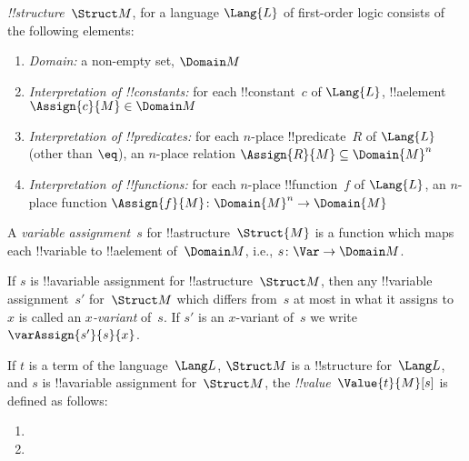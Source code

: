 \documentclass[../../../../include/open-logic-section]{subfiles}
\begin{document}


\begin{defn}[!!^{structure}s]
     \emph{!!{structure}}~$\Struct M$, for a language
    $\Lang{L}$ of first-order logic consists of the following elements:
    \begin{enumerate}
    \item \emph{Domain:} a non-empty set, $\Domain M$
    \item \emph{Interpretation of !!{constant}s:} for each !!{constant}~$c$ of
      $\Lang{L}$, !!a{element} $\Assign{c}{M} \in \Domain M$
    \item \emph{Interpretation of !!{predicate}s:} for each $n$-place
      !!{predicate}~$R$ of $\Lang{L}$ (other than $\eq$), an $n$-place
      relation $\Assign{R}{M} \subseteq \Domain{M}^n$
    \item \emph{Interpretation of !!{function}s:} for each $n$-place
      !!{function}~$f$ of $\Lang{L}$, an $n$-place function $\Assign{f}{M}
      \colon \Domain{M}^n \to \Domain{M}$
    \end{enumerate}
\end{defn}
    
\begin{defn}
    A \emph{variable assignment}~$s$ for !!a{structure}~$\Struct{M}$ is a
    function which maps each !!{variable} to !!a{element} of~$\Domain M$,
    i.e., $s\colon \Var \to \Domain M$.
\end{defn}


\begin{defn}[$x$-Variant]
    If $s$ is !!a{variable} assignment for !!a{structure}~$\Struct M$, then any
    !!{variable} assignment~$s'$ for~$\Struct M$ which differs from~$s$ at most
    in what it assigns to~$x$ is called an \emph{$x$-variant} of~$s$.  If
    $s'$ is an $x$-variant of~$s$ we write $\varAssign{s'}{s}{x}$.
\end{defn}


\begin{defn}
    If $t$ is a term of the language~$\Lang L$, $\Struct M$ is a
    !!{structure} for~$\Lang L$, and $s$ is !!a{variable} assignment
    for~$\Struct M$, the \emph{!!{value}}~$\Value{t}{M}[s]$ is defined as
    follows:
    \begin{enumerate}
    \item {}
    \item {}
    \end{enumerate}
\end{defn}
\end{document}
